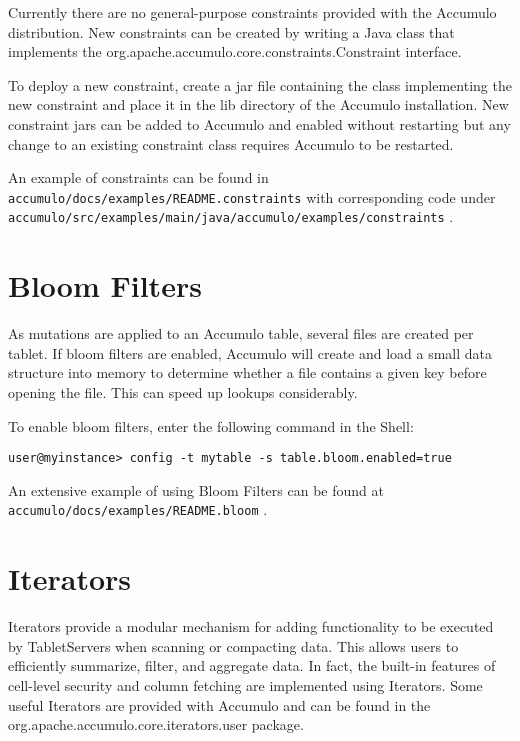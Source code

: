 Currently there are no general-purpose constraints provided with the Accumulo
distribution. New constraints can be created by writing a Java class that implements
the org.apache.accumulo.core.constraints.Constraint interface.

To deploy a new constraint, create a jar file containing the class implementing the
new constraint and place it in the lib directory of the Accumulo installation. New
constraint jars can be added to Accumulo and enabled without restarting but any
change to an existing constraint class requires Accumulo to be restarted.

An example of constraints can be found in\\
\texttt{accumulo/docs/examples/README.constraints} with corresponding code under\\
\texttt{accumulo/src/examples/main/java/accumulo/examples/constraints} .

\section{Bloom Filters}
As mutations are applied to an Accumulo table, several files are created per tablet. If
bloom filters are enabled, Accumulo will create and load a small data structure into
memory to determine whether a file contains a given key before opening the file.
This can speed up lookups considerably.

To enable bloom filters, enter the following command in the Shell:

\small
\begin{verbatim}
user@myinstance> config -t mytable -s table.bloom.enabled=true
\end{verbatim}
\normalsize

An extensive example of using Bloom Filters can be found at\\
\texttt{accumulo/docs/examples/README.bloom} .

\section{Iterators}
Iterators provide a modular mechanism for adding functionality to be executed by
TabletServers when scanning or compacting data. This allows users to efficiently
summarize, filter, and aggregate data. In fact, the built-in features of cell-level
security and column fetching are implemented using Iterators.
Some useful Iterators are provided with Accumulo and can be found in the org.apache.accumulo.core.iterators.user package.

